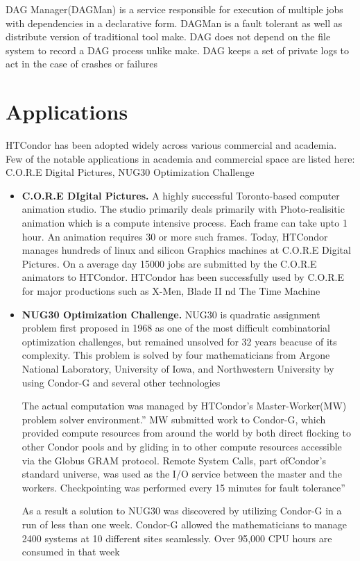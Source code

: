\documentclass[9pt,twocolumn,twoside]{../../styles/osajnl}
\begin{document}
DAG Manager(DAGMan) is a service responsible for execution of multiple
jobs with dependencies in a declarative form. DAGMan is a fault
tolerant as well as distribute version of traditional tool make.  DAG
does not depend on the file system to record a DAG process unlike
make.  DAG keeps a set of private logs to act in the case of crashes
or failures



\section{Applications}
HTCondor has been adopted widely across various commercial and
academia. Few of the notable applications in academia and commercial
space are listed here: C.O.R.E Digital Pictures, NUG30 Optimization
Challenge


\begin{itemize}

\item{\bf C.O.R.E DIgital Pictures.} A highly successful Toronto-based
  computer animation studio. The studio primarily deals primarily with
  Photo-realisitic animation which is a compute intensive process.
  Each frame can take upto 1 hour. An animation requires 30 or more
  such frames. Today, HTCondor manages hundreds of linux and silicon
  Graphics machines at C.O.R.E Digital Pictures. On a average day
  15000 jobs are submitted by the C.O.R.E animators to
  HTCondor. HTCondor has been successfully used by C.O.R.E for major
  productions such as X-Men, Blade II nd The Time Machine

\item{\bf NUG30 Optimization Challenge.} NUG30 is quadratic assignment
  problem first proposed in 1968 as one of the most difficult
  combinatorial optimization challenges, but remained unsolved for 32
  years beacuse of its complexity. This problem is solved by four
  mathematicians from Argone National Laboratory, University of Iowa,
  and Northwestern University by using Condor-G and several other
  technologies

  The actual computation was managed by HTCondor's Master-Worker(MW)
  problem solver environment.'' MW submitted work to Condor-G, which
  provided compute resources from around the world by both direct
  flocking to other Condor pools and by gliding in to other compute
  resources accessible via the Globus GRAM protocol. Remote System
  Calls, part ofCondor’s standard universe, was used as the I/O
  service between the master and the workers. Checkpointing was
  performed every 15 minutes for fault
  tolerance''\cite{condor-practice}

 As a result a solution to NUG30 was discovered by utilizing Condor-G
 in a run of less than one week. Condor-G allowed the mathematicians
 to manage 2400 systems at 10 different sites seamlessly. Over 95,000
 CPU hours are consumed in that week\cite{condor-practice}
 
\end{itemize}
\end{document}
